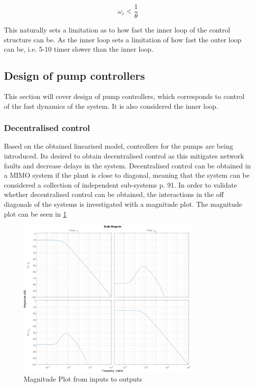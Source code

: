\begin{equation}\label{eq:BWdelay}
	\omega_c < \frac{1}{\theta}
\end{equation}

This naturally sets a limitation as to how fast the inner loop of the control structure can be. As the inner loop sets a limitation of how fast the outer loop can be, i.e. 5-10 timer slower than the inner loop.

\subsection{Design of pump controllers}
This section will cover design of pump controllers, which corresponds to control of the fast dynamics of the system. It is also considered the inner loop. 
\subsubsection{Decentralised control}
Based on the obtained linearised model, controllers for the pumps are being introduced. Its desired to obtain decentralised control as this mitigates network faults and decrease delays in the system. Decentralised control can be obtained in a MIMO system if the plant is close to diagonal, meaning that the system can be considered a collection of independent sub-systems \cite{Skogestad2005} p. 91. 
In order to validate whether decentralised control can be obtained, the interactions in the off diagonals of the systems is investigated with a magnitude plot. The magnitude plot can be seen in \cref{fig:PumpMagPlot}

\begin{figure}[h!]
	\centering
		\includegraphics[width=0.8\textwidth]{Pictures/PumpMagPlot.png}
		
		\caption{Magnitude Plot from inputs to outputs}
	\label{fig:PumpMagPlot}
\end{figure}

